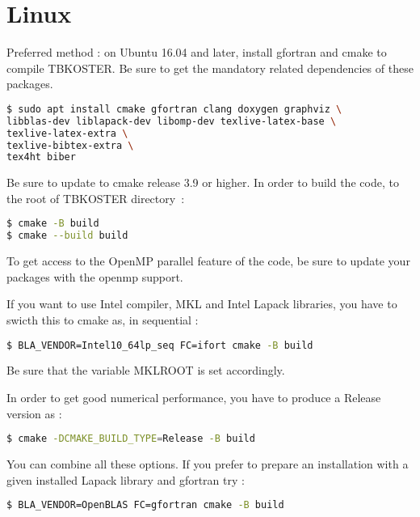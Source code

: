 \documentclass[12pt, onecolumn]{memoir}
\begin{document}
\section{Linux}
Preferred method : on Ubuntu 16.04 and later, install gfortran and cmake to compile TBKOSTER. Be sure to get the mandatory related dependencies of these packages.
\begin{lstlisting}[language=sh,basicstyle=\small]
$ sudo apt install cmake gfortran clang doxygen graphviz \
libblas-dev liblapack-dev libomp-dev texlive-latex-base \ 
texlive-latex-extra \ 
texlive-bibtex-extra \ 
tex4ht biber
\end{lstlisting}
Be sure to update to cmake release 3.9 or higher.
In order to build the code, to the root of TBKOSTER directory~:
\begin{lstlisting}[language=sh,basicstyle=\small]
$ cmake -B build
$ cmake --build build
\end{lstlisting}
To get access to the OpenMP parallel feature of the code, be sure to update your packages with the openmp support.

If you want to use Intel compiler, MKL and Intel Lapack libraries, you have to swicth this to cmake as, in sequential :
\begin{lstlisting}[language=sh,basicstyle=\small]
$ BLA_VENDOR=Intel10_64lp_seq FC=ifort cmake -B build
\end{lstlisting}
Be sure that the variable MKLROOT is set accordingly.

In order to get good numerical performance, you have to produce a Release version as :
\begin{lstlisting}[language=sh,basicstyle=\small]
$ cmake -DCMAKE_BUILD_TYPE=Release -B build
\end{lstlisting}
You can combine all these options.
If you prefer to prepare an installation with a given installed Lapack library and gfortran try :
\begin{lstlisting}[language=sh,basicstyle=\small]
$ BLA_VENDOR=OpenBLAS FC=gfortran cmake -B build
\end{lstlisting}
\end{document}
